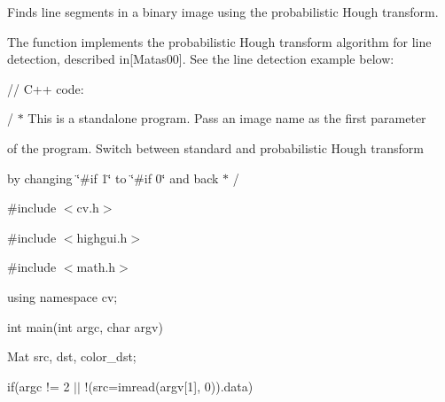Finds line segments in a binary image using the probabilistic Hough transform.

The function implements the probabilistic Hough transform algorithm for line detection, described in\mbox{[}Matas00\mbox{]}. See the line detection example below\+: {\ttfamily }

{\ttfamily }

{\ttfamily }

{\ttfamily // C++ code\+:}

{\ttfamily }

{\ttfamily }

{\ttfamily / $\ast$ This is a standalone program. Pass an image name as the first parameter}

{\ttfamily }

{\ttfamily }

{\ttfamily of the program. Switch between standard and probabilistic Hough transform}

{\ttfamily }

{\ttfamily }

{\ttfamily by changing \char`\"{}\#if 1\char`\"{} to \char`\"{}\#if 0\char`\"{} and back $\ast$ /}

{\ttfamily }

{\ttfamily }

{\ttfamily \#include $<$cv.\+h$>$}

{\ttfamily }

{\ttfamily }

{\ttfamily \#include $<$highgui.\+h$>$}

{\ttfamily }

{\ttfamily }

{\ttfamily \#include $<$math.\+h$>$}

{\ttfamily }

{\ttfamily }

{\ttfamily using namespace cv;}

{\ttfamily }

{\ttfamily }

{\ttfamily int main(int argc, char argv)}

{\ttfamily }

{\ttfamily }

{\ttfamily Mat src, dst, color\+\_\+dst;}

{\ttfamily }

{\ttfamily }

{\ttfamily if(argc != 2 $\vert$$\vert$ !(src=imread(argv\mbox{[}1\mbox{]}, 0)).data)}

{\ttfamily }

